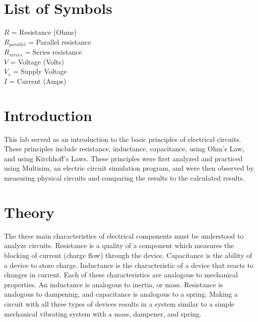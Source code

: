 \documentclass[12pt]{article}
\begin{document}

\tableofcontents

\listoffigures

\bigskip
\bigskip


\section*{\fontsize{12}{12}\selectfont \large List of Symbols}
 $R$ = Resistance (Ohms)\\
$R_{parallel}$ = Parallel resistance\\
$R_{series}$ = Series resistance\\
$V$ = Voltage (Volts)\\
$V_{s}$ = Supply Voltage\\
$I$ = Current (Amps)\\

\newpage


\section*{\fontsize{12}{12}\selectfont \large Introduction}
This lab served as an introduction to the basic principles of electrical circuits. These principles include resistance, inductance, capacitance, using Ohm's Law, and using Kirchhoff's Laws. These principles were first analyzed and practiced using Multisim, an electric circuit simulation program, and were then observed by measuring physical circuits and comparing the results to the calculated results. 



\section*{\fontsize{12}{12}\selectfont \large Theory}
The three main characteristics of electrical components must be understood to analyze circuits. Resistance is a quality of a component which measures the blocking of current (charge flow) through the device. Capacitance is the ability of a device to store charge. Inductance is the characteristic of a device that reacts to changes in current. Each of these characteristics are analogous to mechanical properties. An inductance is analogous to inertia, or mass. Resistance is analogous to dampening, and capacitance is analogous to a spring. Making a circuit with all three types of devices results in a system similar to a simple mechanical vibrating system with a mass, dampener, and spring. 
\bigskip
\end{document}

